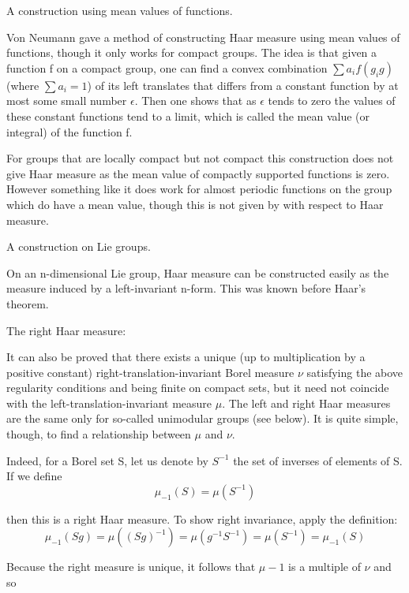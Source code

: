 \documentclass[oneside,12pt]{memoir}
\begin{document}
A construction using mean values of functions.

Von Neumann gave a method of constructing Haar measure using mean values of functions, though it only works for compact groups. The idea is that given a function f on a compact group, one can find a convex combination $\sum a_if(g_ig)$ (where $\sum a_i=1$) of its left translates that differs from a constant function by at most some small number $\epsilon$. Then one shows that as $\epsilon$ tends to zero the values of these constant functions tend to a limit, which is called the mean value (or integral) of the function f.

For groups that are locally compact but not compact this construction does not give Haar measure as the mean value of compactly supported functions is zero. However something like it does work for almost periodic functions on the group which do have a mean value, though this is not given by with respect to Haar measure.

A construction on Lie groups.

On an n-dimensional Lie group, Haar measure can be constructed easily as the measure induced by a left-invariant n-form. This was known before Haar's theorem.

The right Haar measure:

It can also be proved that there exists a unique (up to multiplication by a positive constant) right-translation-invariant Borel measure $\nu$ satisfying the above regularity conditions and being finite on compact sets, but it need not coincide with the left-translation-invariant measure $\mu$. The left and right Haar measures are the same only for so-called unimodular groups (see below). It is quite simple, though, to find a relationship between $\mu$ and $\nu$.

Indeed, for a Borel set S, let us denote by $S^{-1}$ the set of inverses of elements of S. If we define
\begin{equation*}
\mu_{-1}(S) = \mu(S^{-1})
\end{equation*}

then this is a right Haar measure. To show right invariance, apply the definition:
\begin{equation*}
\mu_{-1}(S g) = \mu((S g)^{-1}) = \mu(g^{-1} S^{-1}) = \mu(S^{-1}) = \mu_{-1}(S)
\end{equation*}

Because the right measure is unique, it follows that $\mu-1$ is a multiple of $\nu$ and so
\end{document}
